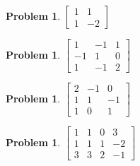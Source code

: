 \documentclass[10pt]{article}
\theoremstyle{definition}
\newtheorem{problem}[theorem]{Problem}
\newcommand{\1}[1]{\textbf{1}_{\left[#1\right]}} %
\begin{document}
\begin{problem}
  $
    \begin{bmatrix}
      1&1\\1&-2
    \end{bmatrix}
  $
\end{problem}

\begin{problem}
  $
    \begin{bmatrix}
      1&-1&1\\-1&1&0\\1&-1&2
    \end{bmatrix}
  $
\end{problem}

\begin{problem}
  $
    \begin{bmatrix}
      2&-1&0\\1&1&-1\\1&0&1
    \end{bmatrix}
  $
\end{problem}

\begin{problem}
  $
    \begin{bmatrix}
      1&1&0&3\\
      1&1&1&-2\\
      3&3&2&-1
    \end{bmatrix}
  $
\end{problem}
\end{document}
